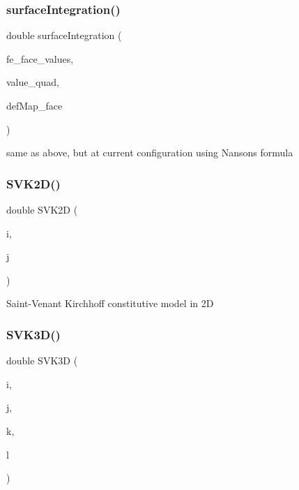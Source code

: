 \subsubsection{\texorpdfstring{surface\+Integration()}{surfaceIntegration()}\hspace{0.1cm}{\footnotesize\ttfamily [6/6]}}
{\footnotesize\ttfamily double surface\+Integration (\begin{DoxyParamCaption}\item[{const F\+E\+Face\+Values$<$ dim $>$ \&}]{fe\+\_\+face\+\_\+values,  }\item[{dealii\+::\+Table$<$ 1, double $>$ \&}]{value\+\_\+quad,  }\item[{\mbox{\hyperlink{structdeformation_map}{deformation\+Map}}$<$ T, dim $>$ \&}]{def\+Map\+\_\+face }\end{DoxyParamCaption})}

same as above, but at current configuration using Nanson\textquotesingle{}s formula \mbox{\label{class_residual_abd1627afa72ac735e6907067e1d47bb6}} 
\subsubsection{\texorpdfstring{S\+V\+K2\+D()}{SVK2D()}}
{\footnotesize\ttfamily double S\+V\+K2D (\begin{DoxyParamCaption}\item[{unsigned int}]{i,  }\item[{unsigned int}]{j }\end{DoxyParamCaption})}

Saint-\/\+Venant Kirchhoff constitutive model in 2D \mbox{\label{class_residual_a10e7144d5c4746f15a48d506830790cb}} 
\subsubsection{\texorpdfstring{S\+V\+K3\+D()}{SVK3D()}}
{\footnotesize\ttfamily double S\+V\+K3D (\begin{DoxyParamCaption}\item[{unsigned int}]{i,  }\item[{unsigned int}]{j,  }\item[{unsigned int}]{k,  }\item[{unsigned int}]{l }\end{DoxyParamCaption})}

